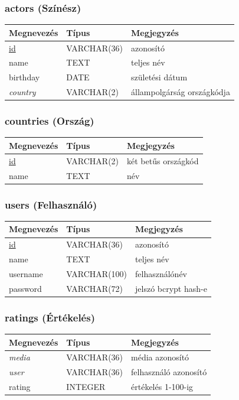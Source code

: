 \documentclass[12pt,a4paper,titlepage]{article}  %
\begin{document}
\subsubsection{actors (Színész)}
\begin{tabular}{|l|l|l|}
	\hline
	Megnevezés & Típus & Megjegyzés \\
	\hline
	\underline{id} & VARCHAR(36) & azonosító \\
	\hline
	name & TEXT & teljes név \\
	\hline
	birthday & DATE & születési dátum \\
	\hline
	\textit{country} & VARCHAR(2) & állampolgárság országkódja \\
	\hline
\end{tabular}

\subsubsection{countries (Ország)}
\begin{tabular}{|l|l|l|}
	\hline
	Megnevezés & Típus & Megjegyzés \\
	\hline
	\underline{id} & VARCHAR(2) & két betűs országkód \\
	\hline
	name & TEXT & név \\
	\hline
\end{tabular}

\subsubsection{users (Felhasználó)}
\begin{tabular}{|l|l|l|}
	\hline
	Megnevezés & Típus & Megjegyzés \\
	\hline
	\underline{id} & VARCHAR(36) & azonosító \\
	\hline
	name & TEXT & teljes név \\
	\hline
	username & VARCHAR(100) & felhasználónév \\
	\hline
	password & VARCHAR(72) & jelszó bcrypt hash-e \\
	\hline
\end{tabular}

\subsubsection{ratings (Értékelés)}
\begin{tabular}{|l|l|l|}
	\hline
	Megnevezés & Típus & Megjegyzés \\
	\hline
	\textit{media} & VARCHAR(36) & média azonosító \\
	\hline
	\textit{user} & VARCHAR(36) & felhasználó azonosító \\
	\hline
	rating & INTEGER & értékelés 1-100-ig \\
	\hline
\end{tabular}
\end{document}
